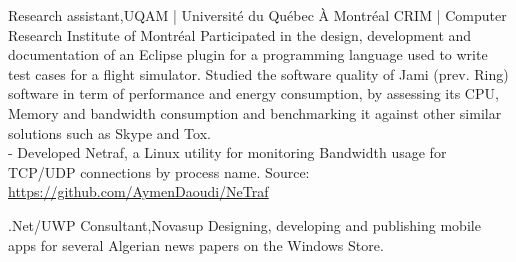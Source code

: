     \resumeSubheading
    {Research assistant,}{UQAM | Université du Québec À Montréal}{}
    {}
      \resumeItemListStart
        \renewcommand{\labelitemii}{\raisebox{.39cm}{$\bullet$}}
        \renewcommand{\labelitemii}{\raisebox{.15cm}{$\bullet$}}
        \renewcommand{\labelitemii}{\raisebox{.25cm}{$\bullet$}}
        \resumeItem
         {CRIM | Computer Research Institute of Montréal}
         {Participated in the design, development and documentation of an Eclipse plugin for a programming language 
          used to write test cases for a flight simulator.}
        \renewcommand{\labelitemii}{\scriptsize \raisebox{.0cm}{\ding{118}}}
        \renewcommand{\labelitemii}{\raisebox{.88cm}{$\bullet$}}
          {Studied the software quality of Jami (prev. Ring) software in term of performance and energy consumption, by assessing 
          its CPU, Memory and bandwidth consumption and benchmarking it against other similar solutions such as Skype and Tox.\\
          - Developed Netraf, a Linux utility for monitoring Bandwidth usage for TCP/UDP connections by process name.
          Source: \underline{\url{https://github.com/AymenDaoudi/NeTraf}}}
        \renewcommand{\labelitemii}{\scriptsize \raisebox{.0cm}{\ding{118}}}
      \resumeItemListEnd

    \resumeSubheading
    {.Net/UWP Consultant,}{Novasup}{}{}
      \resumeItemListStart
      \renewcommand{\labelitemii}{\raisebox{.2cm}{$\bullet$}}
          {Designing, developing and publishing mobile apps for several Algerian news papers on the Windows Store.}
        \renewcommand{\labelitemii}{\scriptsize \raisebox{.0cm}{\ding{118}}}
      \resumeItemListEnd

